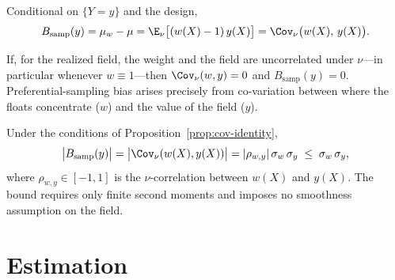 \begin{proposition}
\label{prop:cov-identity}
Conditional on $\{Y=y\}$ and the design, 
\[
  B_{\mathrm{samp}}(y) = \mu_w - \mu
  = \E_\nu\big[(w(X)-1)\,y(X)\big]
  = \Cov_\nu\big(w(X),\,y(X)\big).
\]
\end{proposition}

\begin{remark}
\label{rem:zero-bias}
If, for the realized field, the weight and the field are uncorrelated
under $\nu$---in particular whenever $w\equiv1$---then
$\Cov_\nu(w,y)=0$ and $B_{\mathrm{samp}}(y)=0$. Preferential-sampling
bias arises precisely from co-variation between where the floats
concentrate ($w$) and the value of the field ($y$).
\end{remark}

\begin{proposition}
\label{prop:l2-bound}
Under the conditions of Proposition~\ref{prop:cov-identity},
\[
  \big|B_{\mathrm{samp}}(y)\big|
  = \big|\Cov_\nu(w(X),y(X))\big|
  = |\rho_{w,y}|\,\sigma_w\,\sigma_y
  \;\le\; \sigma_w\,\sigma_y,
\]
where $\rho_{w,y}\in[-1,1]$ is the $\nu$-correlation between $w(X)$ and
$y(X)$. The bound requires only finite second moments and imposes no
smoothness assumption on the field.
\end{proposition}

\section{Estimation}
\label{sec:estimation}

